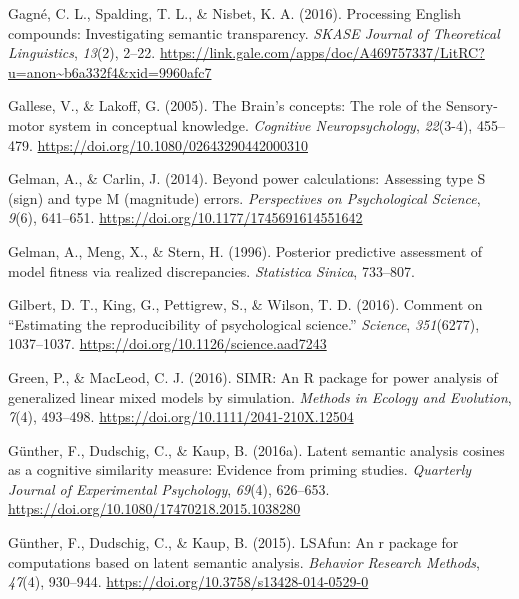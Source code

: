 \documentclass[
  12pt,
  man,floatsintext]{apa7}
\newlength{\cslhangindent}
\newlength{\cslentryspacingunit} %
\newenvironment{CSLReferences}[2] %
 {%
  \setlength{\parindent}{0pt}
  \ifodd #1
  \let\oldpar\par
  \def\par{\hangindent=\cslhangindent\oldpar}
  \fi
  \setlength{\parskip}{#2\cslentryspacingunit}
 }%
 {}
\begin{document}
\begin{CSLReferences}{1}{0}
\leavevmode{}%
Gagné, C. L., Spalding, T. L., \& Nisbet, K. A. (2016). Processing {English} compounds: {Investigating} semantic transparency. \emph{SKASE Journal of Theoretical Linguistics}, \emph{13}(2), 2--22. \url{https://link.gale.com/apps/doc/A469757337/LitRC?u=anon~b6a332f4\&xid=9960afc7}

\leavevmode{}%
Gallese, V., \& Lakoff, G. (2005). The {Brain}'s concepts: The role of the {Sensory-motor} system in conceptual knowledge. \emph{Cognitive Neuropsychology}, \emph{22}(3-4), 455--479. \url{https://doi.org/10.1080/02643290442000310}

\leavevmode{}%
Gelman, A., \& Carlin, J. (2014). Beyond power calculations: Assessing type {S} (sign) and type {M} (magnitude) errors. \emph{Perspectives on Psychological Science}, \emph{9}(6), 641--651. \url{https://doi.org/10.1177/1745691614551642}

\leavevmode{}%
Gelman, A., Meng, X., \& Stern, H. (1996). Posterior predictive assessment of model fitness via realized discrepancies. \emph{Statistica Sinica}, 733--807.

\leavevmode{}%
Gilbert, D. T., King, G., Pettigrew, S., \& Wilson, T. D. (2016). Comment on {``{Estimating} the reproducibility of psychological science.''} \emph{Science}, \emph{351}(6277), 1037--1037. \url{https://doi.org/10.1126/science.aad7243}

\leavevmode{}%
Green, P., \& MacLeod, C. J. (2016). {SIMR}: {An R} package for power analysis of generalized linear mixed models by simulation. \emph{Methods in Ecology and Evolution}, \emph{7}(4), 493--498. \url{https://doi.org/10.1111/2041-210X.12504}

\leavevmode{}%
Günther, F., Dudschig, C., \& Kaup, B. (2016a). Latent semantic analysis cosines as a cognitive similarity measure: {Evidence} from priming studies. \emph{Quarterly Journal of Experimental Psychology}, \emph{69}(4), 626--653. \url{https://doi.org/10.1080/17470218.2015.1038280}

\leavevmode{}%
Günther, F., Dudschig, C., \& Kaup, B. (2015). LSAfun: An r package for computations based on latent semantic analysis. \emph{Behavior Research Methods}, \emph{47}(4), 930--944. \url{https://doi.org/10.3758/s13428-014-0529-0}


\end{CSLReferences}
\end{document}

